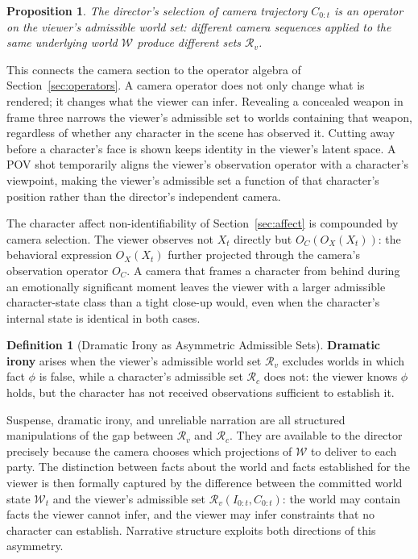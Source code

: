 \documentclass[11pt,a4paper]{article}
\theoremstyle{plain}
\newtheorem{proposition}[theorem]{Proposition}
\theoremstyle{definition}
\newtheorem{definition}[theorem]{Definition}
\theoremstyle{remark}
\begin{document}
\begin{proposition}
The director's selection of camera trajectory $C_{0:t}$ is an operator on the viewer's admissible world set: different camera sequences applied to the same underlying world $\mathcal{W}$ produce different sets $\mathcal{R}_v$.
\end{proposition}

This connects the camera section to the operator algebra of Section~\ref{sec:operators}. A camera operator does not only change what is rendered; it changes what the viewer can infer. Revealing a concealed weapon in frame three narrows the viewer's admissible set to worlds containing that weapon, regardless of whether any character in the scene has observed it. Cutting away before a character's face is shown keeps identity in the viewer's latent space. A POV shot temporarily aligns the viewer's observation operator with a character's viewpoint, making the viewer's admissible set a function of that character's position rather than the director's independent camera.

The character affect non-identifiability of Section~\ref{sec:affect} is compounded by camera selection. The viewer observes not $X_t$ directly but $O_C(O_X(X_t))$: the behavioral expression $O_X(X_t)$ further projected through the camera's observation operator $O_C$. A camera that frames a character from behind during an emotionally significant moment leaves the viewer with a larger admissible character-state class than a tight close-up would, even when the character's internal state is identical in both cases.

\begin{definition}[Dramatic Irony as Asymmetric Admissible Sets]
\textbf{Dramatic irony} arises when the viewer's admissible world set $\mathcal{R}_v$ excludes worlds in which fact $\phi$ is false, while a character's admissible set $\mathcal{R}_c$ does not: the viewer knows $\phi$ holds, but the character has not received observations sufficient to establish it.
\end{definition}

Suspense, dramatic irony, and unreliable narration are all structured manipulations of the gap between $\mathcal{R}_v$ and $\mathcal{R}_c$. They are available to the director precisely because the camera chooses which projections of $\mathcal{W}$ to deliver to each party. The distinction between facts about the world and facts established for the viewer is then formally captured by the difference between the committed world state $\mathcal{W}_t$ and the viewer's admissible set $\mathcal{R}_v(I_{0:t}, C_{0:t})$: the world may contain facts the viewer cannot infer, and the viewer may infer constraints that no character can establish. Narrative structure exploits both directions of this asymmetry.
\end{document}
